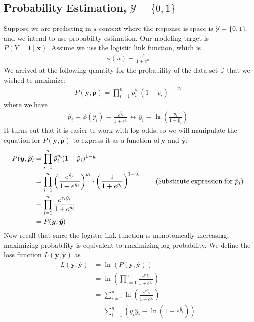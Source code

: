 \documentclass[12pt, a4paper]{article}
\theoremstyle{definition}
\begin{document}
	\subsection*{Probability Estimation, $\mathcal{Y} = \{0, 1\}$}
	Suppose we are predicting in a context where the response is space
	is $\mathcal{Y} = \{0, 1\}$, and we intend to use probability estimation.
	Our modeling target is $P(Y = 1 \mid \bm{x})$. Assume we use the logistic
	link function, which is
	\begin{align*}
		\phi(u) = \frac{e^u}{1 + e^u}
	\end{align*}
	We arrived at the following quantity for the probability of the data set
	$\mathbb{D}$ that we wished to maximize:
	\begin{align*}
		P(\bm{y}, \hat{\bm{p}}) = \prod_{i=1}^{n}\hat{p}_i^{y_i}(1-\hat{p}_i)^{1-y_i}
	\end{align*}
	where we have
	\begin{align*}
		\hat{p}_i = \phi(\hat{y}_i) = \frac{e^{\hat{y}_i}}{1 + e^{\hat{y}_i}}
		\iff
		\hat{y}_i = \ln  \left(\frac{\hat{p}_i}{1 - \hat{p}_i}\right)
	\end{align*}
	It turns out that it is easier to work with log-odds, so we will
	manipulate the equation for $P(\bm{y}, \hat{\bm{p}})$ to express
	it as a function of $\bm{y}$ and $\hat{\bm{y}}$:
	\begin{align*}
		P(\bm{y}, \hat{\bm{p}})
		&= \prod_{i=1}^{n}\hat{p}_i^{y_i}(1-\hat{p}_i)^{1-y_i}\\
		&= \prod_{i=1}^{n}
		\left(\frac{e^{\hat{y}_i}}{1 + e^{\hat{y}_i}}\right)^{y_i}\cdot
		\left(\frac{1}{1 + e^{\hat{y}_i}}\right)^{1 - y_i}
		\tag{Substitute expression for $\hat{p}_i$}\\
		&= \prod_{i=1}^{n} \frac{e^{y_i \hat{y}_i}}{1 + e^{\hat{y}_i}}\\
		&=P(\bm{y}, \hat{\bm{y}})
	\end{align*}
	Now recall that since the logistic link function is monotonically increasing,
	maximizing probability is equivalent to maximizing log-probability.
	We define the loss function $L(\bm{y}, \hat{\bm{y}})$ as
	\begin{align*}
		L(\bm{y}, \hat{\bm{y}})
		&=\ln(P(\bm{y}, \hat{\bm{y}}))\\
		&=\ln \left(\prod_{i=1}^{n} \frac{e^{y_i \hat{y}_i}}{1 + e^{\hat{y}_i}}\right)\\
		&=\sum_{i=1}^{n}\ln\left(\frac{e^{y_i \hat{y}_i}}{1 + e^{\hat{y}_i}}\right)
		\tag{Product property of logarithms}\\
		&=\sum_{i=1}^{n}(y_i\hat{y}_i - \ln(1 + e^{\hat{y}_i}))
		\tag{Quotient property of logarithms}
	\end{align*}
\end{document}
